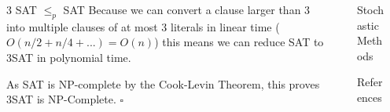 \documentclass[final]{beamer}
\newlength{\sepwidth}
\newlength{\colwidth}
\newcounter{col}
\newcommand{\separatorcolumn}{\begin{column}{\sepwidth}\end{column}}
\begin{document}
\begin{frame}[t]
\begin{columns}[t]
\begin{column}{\colwidth}
\begin{block}{3 SAT $\leq_p$  SAT}
Because we can convert a clause larger than 3 into multiple clauses of at most 3 literals in linear time ($O(n/2 + n/4 + ...) = O(n)$) this means we can reduce SAT to 3SAT in polynomial time. 

As SAT is NP-complete by the Cook-Levin Theorem, this proves 3SAT is NP-Complete. $\square$

  \end{block}
\end{column}

\separatorcolumn

\begin{column}{\colwidth}
  \begin{exampleblock}{Stochastic Methods}
  \end{exampleblock}

  \begin{block}{}
  \end{block}

  \begin{block}{References}
    \nocite{*}
    \footnotesize{}
  \end{block}
\end{column}

\separatorcolumn
\end{columns}
\end{frame}
\end{document}

